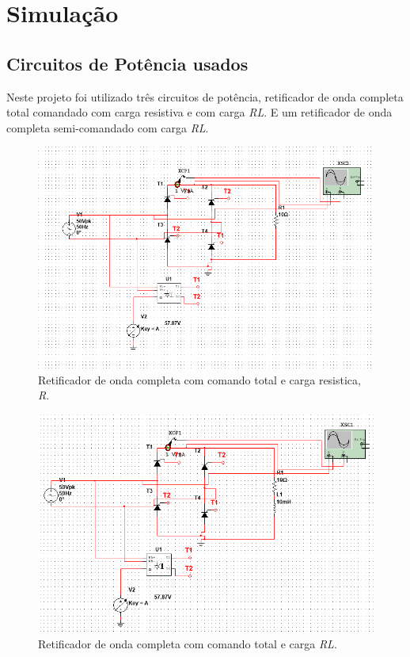 \documentclass[a4paper,11pt]{article}
\numberwithin{equation}{section}
\begin{document}
\pagebreak
\section{Simulação}
\subsection{Circuitos de Potência usados}
Neste projeto foi utilizado três circuitos de potência, retificador de onda completa total comandado com carga resistiva e com carga \textit{RL}. E um retificador de onda completa semi-comandado com carga \textit{RL}. 

\begin{figure}[h]
	\centering
	\includegraphics[keepaspectratio=true, scale=0.5]{img/circuito1}
	\caption{Retificador de onda completa com comando total e carga resistica, \textit{R}.}
	\label{fig:circuit_3}
	\vspace{-0.8em}
\end{figure}

\begin{figure}[h]
	\centering
	\includegraphics[keepaspectratio=true, scale=0.5]{img/circuito2}
	\caption{Retificador de onda completa com comando total e carga \textit{RL}.}
	\label{fig:circuit_4}
	\vspace{-0.8em}
\end{figure}
\end{document}

